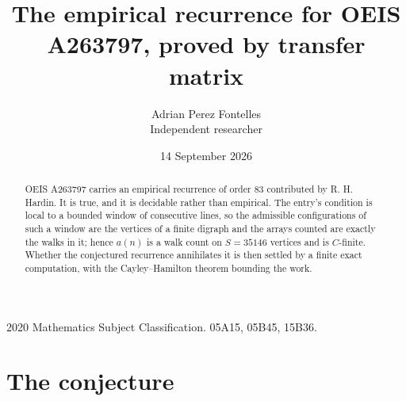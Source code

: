 \documentclass[11pt,a4paper]{article}
\title{The empirical recurrence for OEIS A263797, proved by transfer matrix}
\author{Adrian Perez Fontelles\\ \small Independent researcher}
\date{14 September 2026}
\theoremstyle{plain}
\theoremstyle{definition}
\begin{document}
\maketitle

\begin{abstract}
OEIS A263797 carries an empirical recurrence of order $83$ contributed by R. H. Hardin. It is
true, and it is decidable rather than empirical. The entry's condition is local to a bounded window of consecutive lines, so
the admissible configurations of such a window are the vertices of a finite digraph and the
arrays counted are exactly the walks in it; hence $a(n)$ is a walk count on $S=35146$ vertices
and is $C$-finite. Whether the conjectured recurrence annihilates it is then settled by a
finite exact computation, with the Cayley--Hamilton theorem bounding the work.
\end{abstract}

\noindent\small 2020 Mathematics Subject Classification. 05A15, 05B45, 15B36.\normalsize

\section{The conjecture}
\end{document}
